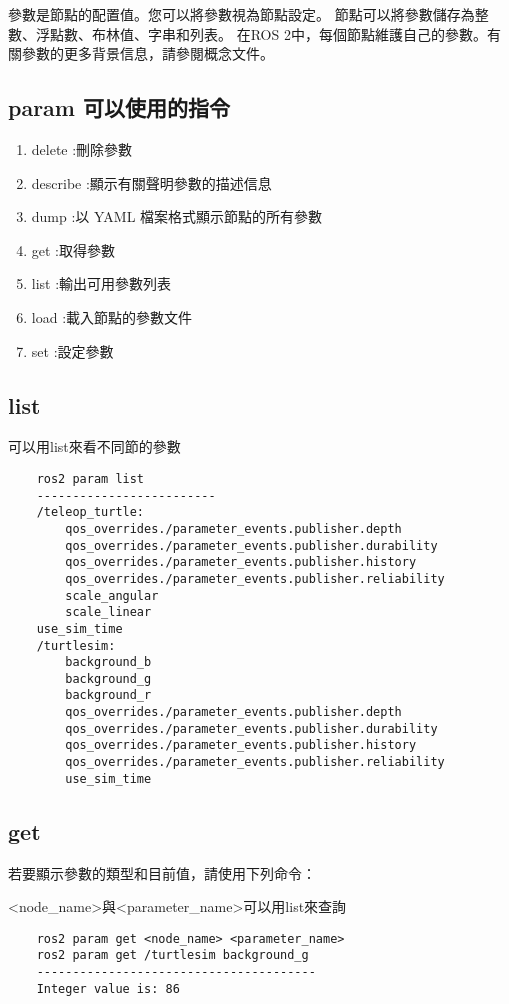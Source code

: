 參數是節點的配置值。您可以將參數視為節點設定。
節點可以將參數儲存為整數、浮點數、布林值、字串和列表。
在ROS 2中，每個節點維護自己的參數。有關參數的更多背景信息，請參閱概念文件。

\subsection{param 可以使用的指令}
\begin{enumerate}
\item     delete   :刪除參數
\item  describe :顯示有關聲明參數的描述信息
\item  dump     :以 YAML 檔案格式顯示節點的所有參數
\item  get      :取得參數
\item  list     :輸出可用參數列表
\item  load     :載入節點的參數文件
\item  set      :設定參數
\end{enumerate}


\subsection{list}
可以用list來看不同節的參數
\begin{verbatim}
    ros2 param list
    -------------------------
    /teleop_turtle:
        qos_overrides./parameter_events.publisher.depth
        qos_overrides./parameter_events.publisher.durability
        qos_overrides./parameter_events.publisher.history
        qos_overrides./parameter_events.publisher.reliability
        scale_angular
        scale_linear
    use_sim_time
    /turtlesim:
        background_b
        background_g
        background_r
        qos_overrides./parameter_events.publisher.depth
        qos_overrides./parameter_events.publisher.durability
        qos_overrides./parameter_events.publisher.history
        qos_overrides./parameter_events.publisher.reliability
        use_sim_time
\end{verbatim}

\subsection{get}
若要顯示參數的類型和目前值，請使用下列命令：

<node\_name>與<parameter\_name>可以用list來查詢
\begin{verbatim}
    ros2 param get <node_name> <parameter_name>
    ros2 param get /turtlesim background_g
    ---------------------------------------
    Integer value is: 86
\end{verbatim}
